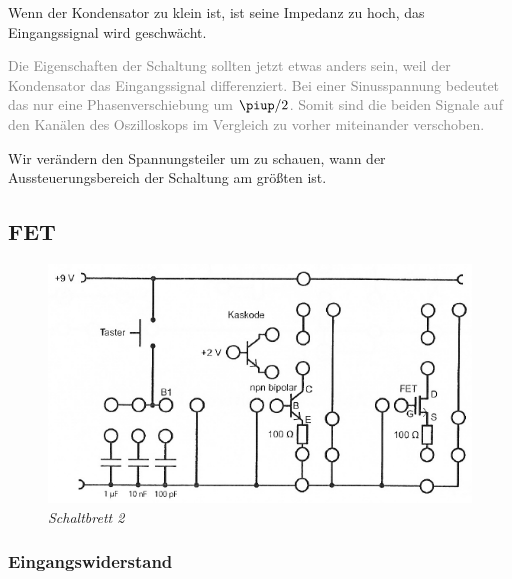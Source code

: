Wenn der Kondensator zu klein ist, ist seine Impedanz zu hoch, das
Eingangssignal wird geschwächt.

\textcolor{gray}{
	Die Eigenschaften der Schaltung sollten jetzt etwas anders sein, weil der
	Kondensator das Eingangssignal differenziert. Bei einer Sinusspannung
	bedeutet das nur eine Phasenverschiebung um $\piup/2$. Somit sind die
	beiden Signale auf den Kanälen des Oszilloskops im Vergleich zu vorher
	miteinander verschoben.
}

Wir verändern den Spannungsteiler um zu schauen, wann der Aussteuerungsbereich
der Schaltung am größten ist.

\fehlt

\FloatBarrier
\subsection{FET}

\begin{figure}[htbp]
	\centering
	\includegraphics[width=\textwidth]{Anleitung/3-5.png}
	\caption{
		\emph{Schaltbrett 2} \cite[Abbildung~3.5]{physik313-Anleitung}
	}
	\label{fig:3-5}
\end{figure}

\fehlt

\subsubsection{Eingangswiderstand}

\fehlt


\FloatBarrier
